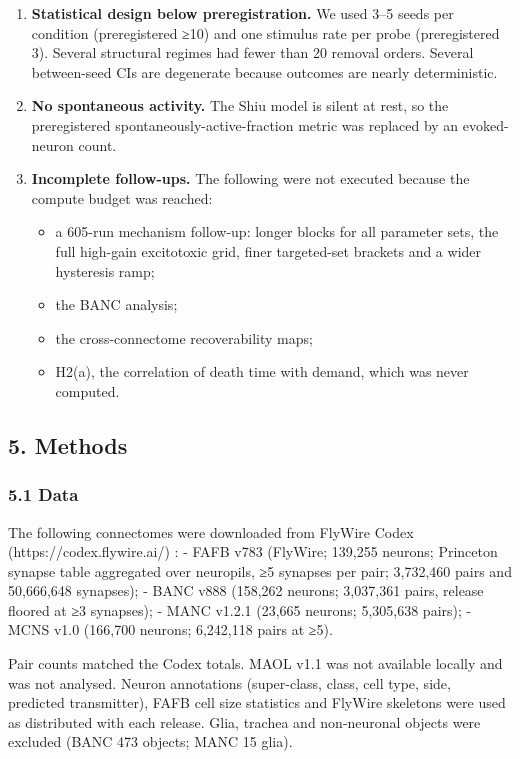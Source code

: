 \documentclass[11pt]{article}
\providecommand{\tightlist}{\setlength{\itemsep}{0pt}\setlength{\parskip}{0pt}}
\begin{document}
\begin{enumerate}
\item
  \textbf{Statistical design below preregistration.} We used 3--5 seeds per condition (preregistered ≥10) and one stimulus rate per probe (preregistered 3). Several structural regimes had fewer than 20 removal orders. Several between-seed CIs are degenerate because outcomes are nearly deterministic.
\item
  \textbf{No spontaneous activity.} The Shiu model is silent at rest, so the preregistered spontaneously-active-fraction metric was replaced by an evoked-neuron count.
\item
  \textbf{Incomplete follow-ups.} The following were not executed because the compute budget was reached:

  \begin{itemize}
  \tightlist
  \item
    a 605-run mechanism follow-up: longer blocks for all parameter sets, the full high-gain excitotoxic grid, finer targeted-set brackets and a wider hysteresis ramp;
  \item
    the BANC analysis;
  \item
    the cross-connectome recoverability maps;
  \item
    H2(a), the correlation of death time with demand, which was never computed.
  \end{itemize}
\end{enumerate}

\subsection{5. Methods}\label{methods}

\subsubsection{5.1 Data}\label{data}

The following connectomes were downloaded from FlyWire Codex (https://codex.flywire.ai/) \cite{dorkenwald2024,schlegel2024,bates2026,takemura2024,marin2024,berg2026}:
- FAFB v783 (FlyWire; 139,255 neurons; Princeton synapse table aggregated over neuropils, ≥5 synapses per pair; 3,732,460 pairs and 50,666,648 synapses);
- BANC v888 (158,262 neurons; 3,037,361 pairs, release floored at ≥3 synapses);
- MANC v1.2.1 (23,665 neurons; 5,305,638 pairs);
- MCNS v1.0 (166,700 neurons; 6,242,118 pairs at ≥5).

Pair counts matched the Codex totals. MAOL v1.1 \cite{nern2025} was not available locally and was not analysed. Neuron annotations (super-class, class, cell type, side, predicted transmitter), FAFB cell size statistics and FlyWire skeletons were used as distributed with each release. Glia, trachea and non-neuronal objects were excluded (BANC 473 objects; MANC 15 glia).
\end{document}
